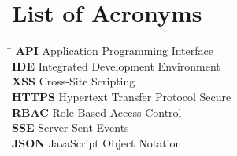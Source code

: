 \section*{List of Acronyms}


\begin{tabbing}
\hspace{2.5cm} \= \kill
\textbf{API} \> Application Programming Interface \\
\textbf{IDE} \> Integrated Development Environment \\
\textbf{XSS} \> Cross-Site Scripting \\
\textbf{HTTPS} \> Hypertext Transfer Protocol Secure \\
\textbf{RBAC} \> Role-Based Access Control \\
\textbf{SSE} \> Server-Sent Events \\
\textbf{JSON} \> JavaScript Object Notation \\
\end{tabbing}